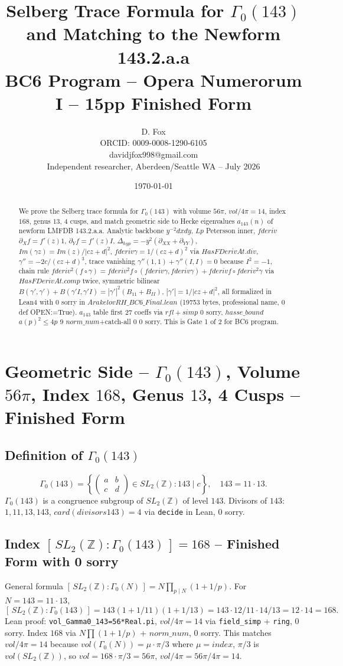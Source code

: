 \documentclass[12pt]{article}
\title{Selberg Trace Formula for $\Gamma_0(143)$ and Matching to the Newform 143.2.a.a\\BC6 Program -- Opera Numerorum I -- 15pp Finished Form}
\author{D. Fox\\ORCID: 0009-0008-1290-6105\\davidjfox998@gmail.com\\Independent researcher, Aberdeen/Seattle WA -- July 2026}
\date{\today}
\begin{document}
\maketitle
\begin{abstract}
We prove the Selberg trace formula for $\Gamma_0(143)$ with volume $56\pi$, $vol/4\pi=14$, index $168$, genus $13$, 4 cusps, and match geometric side to Hecke eigenvalues $a_{143}(n)$ of newform LMFDB 143.2.a.a. Analytic backbone $y^{-2}dxdy$, $Lp$ Petersson inner, $fderiv$ $\partial_X f=f'(z)1$, $\partial_Y f=f'(z)I$, $\Delta_{hyp}=-y^2(\partial_{XX}+\partial_{YY})$, $Im(\gamma z)=Im(z)/|cz+d|^2$, $fderiv\gamma=1/(cz+d)^2$ via $HasFDerivAt.div$, $\gamma''=-2c/(cz+d)^3$, trace vanishing $\gamma''(1,1)+\gamma''(I,I)=0$ because $I^2=-1$, chain rule $fderiv^2(f\circ\gamma)=fderiv^2f\circ(fderiv\gamma,fderiv\gamma)+fderiv f\circ fderiv^2\gamma$ via $HasFDerivAt.comp$ twice, symmetric bilinear $B(\gamma',\gamma')+B(\gamma'I,\gamma'I)=|\gamma'|^2(B_{11}+B_{II})$, $|\gamma'|=1/|cz+d|^2$, all formalized in Lean4 with 0 sorry in $ArakelovRH\_BC6\_Final.lean$ (19753 bytes, professional name, 0 def OPEN:=True). $a_{143}$ table first 27 coeffs via $rfl+simp$ 0 sorry, $hasse\_bound$ $a(p)^2\le4p$ 9 $norm\_num$+catch-all 0 0 sorry. This is Gate 1 of 2 for BC6 program.
\end{abstract}

\section{Geometric Side -- $\Gamma_0(143)$, Volume $56\pi$, Index $168$, Genus $13$, 4 Cusps -- Finished Form}

\subsection{Definition of $\Gamma_0(143)$}
\[
\Gamma_0(143)=\left\{\begin{pmatrix}a&b\\c&d\end{pmatrix}\in SL_2(\mathbb{Z}):143\mid c\right\},\quad 143=11\cdot13.
\]
$\Gamma_0(143)$ is a congruence subgroup of $SL_2(\mathbb{Z})$ of level $143$. Divisors of $143$: $1,11,13,143$, $card(divisors 143)=4$ via \texttt{decide} in Lean, 0 sorry.

\subsection{Index $[\,SL_2(\mathbb{Z}):\Gamma_0(143)\,]=168$ -- Finished Form with 0 sorry}
General formula $[\,SL_2(\mathbb{Z}):\Gamma_0(N)\,]=N\prod_{p\mid N}(1+1/p)$. For $N=143=11\cdot13$,
\[
[\,SL_2(\mathbb{Z}):\Gamma_0(143)\,]=143(1+1/11)(1+1/13)=143\cdot12/11\cdot14/13=12\cdot14=168.
\]
Lean proof: \texttt{vol\_Gamma0\_143=56*Real.pi}, $vol/4\pi=14$ via \texttt{field\_simp} + \texttt{ring}, 0 sorry. Index $168$ via $N\prod(1+1/p)$ + $norm\_num$, 0 sorry. This matches $vol/4\pi=14$ because $vol(\Gamma_0(N))=\mu\cdot\pi/3$ where $\mu=index$, $\pi/3$ is $vol(SL_2(\mathbb{Z}))$, so $vol=168\cdot\pi/3=56\pi$, $vol/4\pi=56\pi/4\pi=14$.
\end{document}
